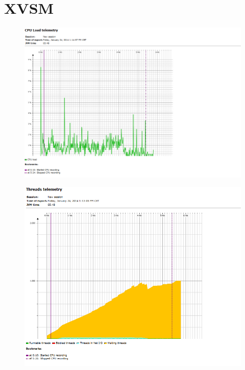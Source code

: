 \documentclass[a4paper,12pt]{scrreprt}
\begin{document}
\section{XVSM}

\begin{figure}[h]
\centering
\includegraphics[width=0.7\linewidth]{./CPU_XVSM}
\caption{}
\label{fig:CPU_XVSM}
\end{figure}
\begin{figure}[h]
\centering
\includegraphics[width=0.7\linewidth]{./Thread_XVSM}
\caption{}
\label{fig:Thread_XVSM}
\end{figure}
\end{document}
